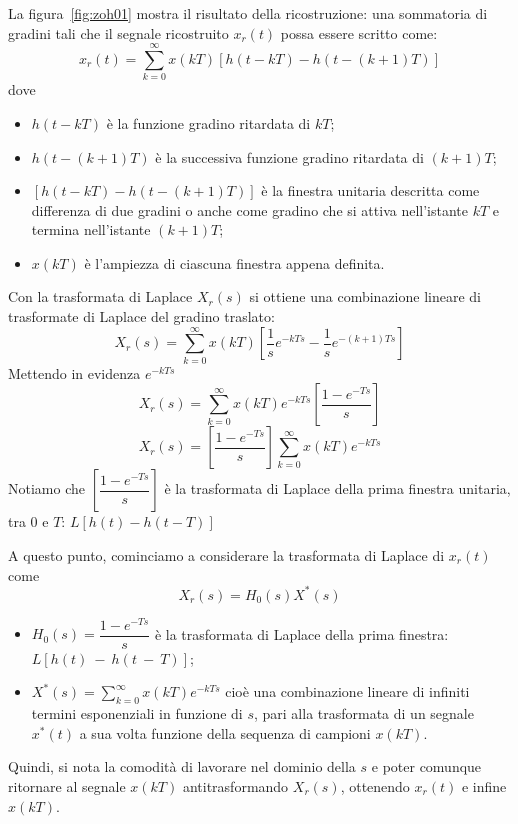 \documentclass[a4paper]{report}
\begin{document}
La figura~\ref{fig:zoh01} mostra il risultato della ricostruzione: una
sommatoria di gradini tali che il segnale ricostruito $x_r(t)$ possa
essere scritto come: 
\begin{equation}\label{eq:zoh00}
  x_r(t) = \sum_{k = 0}^{\infty} x(kT) [h(t - kT) - h(t - (k + 1)T)]
\end{equation}
dove
\begin{itemize}
\item $h(t - kT)$ \`e la funzione gradino ritardata di $kT$;
\item $h(t - (k + 1)T)$ \`e la successiva funzione gradino ritardata di
  $(k + 1)T$;
\item $[h(t - kT) - h(t - (k + 1)T)]$ \`e la finestra unitaria
  descritta come differenza di due gradini o anche come gradino che si
  attiva nell'istante $kT$ e termina nell'istante $(k + 1)T$;
\item $x(kT)$ \`e l'ampiezza di ciascuna finestra appena definita.
\end{itemize}

Con la trasformata di Laplace $X_r(s)$ si ottiene una combinazione
lineare di trasformate di Laplace del gradino traslato:
\[
X_r(s) = \sum_{k=0}^{\infty} x(kT) \left[ \dfrac{1}{s}e^{-kTs} -
  \dfrac{1}{s}e^{-(k+1)Ts}\right] 
\]
Mettendo in evidenza $e^{-kTs}$
\[
X_r(s) = \sum_{k=0}^{\infty} x(kT) e^{-kTs}\left[ \dfrac{1 -
    e^{-Ts}}{s}\right]  
\]
\[
X_r(s) = \left[ \dfrac{1 - e^{-Ts}}{s}\right]  \sum_{k=0}^{\infty}
x(kT) e^{-kTs}
\]
Notiamo che $\left[ \dfrac{1 - e^{-Ts}}{s}\right]$ \`e la trasformata
di Laplace della prima finestra unitaria, tra 0 e $T$: $L[h(t) - h(t -
  T)]$

A questo punto, cominciamo a considerare la trasformata di Laplace
di $x_r(t)$ come
\[
X_r(s) = H_0(s) X^{*}(s)
\]
\begin{itemize}
\item $H_0(s) = \dfrac{1 - e^{-Ts}}{s}$ \`e la trasformata di Laplace
  della prima finestra:\\$L[h(t)~-~h(t~-~T)]$;
\item $X^{*}(s) = \sum_{k=0}^{\infty} x(kT) e^{-kTs}$ cio\`e una
  combinazione lineare di infiniti termini esponenziali in funzione di
  $s$, pari alla trasformata di un segnale $x^{*}(t)$ a sua volta
  funzione della sequenza di campioni $x(kT)$.
\end{itemize}
Quindi, si nota la comodit\`a di lavorare nel dominio della $s$ e
poter comunque ritornare al segnale $x(kT)$ antitrasformando $X_r(s)$,
ottenendo $x_r(t)$ e infine $x(kT)$.
\end{document}
